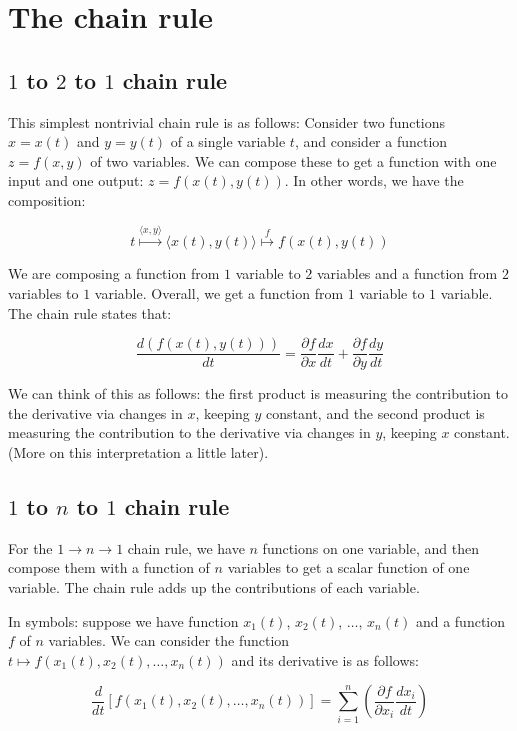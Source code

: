 \documentclass[10pt]{amsart}
\begin{document}
\section{The chain rule}

\subsection{$1$ to $2$ to $1$ chain rule}

This simplest nontrivial chain rule is as follows: Consider two
functions $x = x(t)$ and $y = y(t)$ of a single variable $t$, and
consider a function $z = f(x,y)$ of two variables. We can compose
these to get a function with one input and one output: $z =
f(x(t),y(t))$. In other words, we have the composition:

$$t \stackrel{\langle x, y \rangle}{\mapsto} \langle x(t), y(t) \rangle \stackrel{f}{\mapsto} f(x(t),y(t))$$

We are composing a function from $1$ variable to $2$ variables and a
function from $2$ variables to $1$ variable. Overall, we get a
function from $1$ variable to $1$ variable. The chain rule states that:

$$\frac{d(f(x(t),y(t)))}{dt} = \frac{\partial f}{\partial x} \frac{dx}{dt} + \frac{\partial f}{\partial y}\frac{dy}{dt}$$

We can think of this as follows: the first product is measuring the
contribution to the derivative via changes in $x$, keeping $y$
constant, and the second product is measuring the contribution to the
derivative via changes in $y$, keeping $x$ constant. (More on this
interpretation a little later).

\subsection{$1$ to $n$ to $1$ chain rule}

For the $1 \to n \to 1$ chain rule, we have $n$ functions on one
variable, and then compose them with a function of $n$ variables to
get a scalar function of one variable. The chain rule adds up the
contributions of each variable.

In symbols: suppose we have function $x_1(t)$, $x_2(t)$, $\dots$,
$x_n(t)$ and a function $f$ of $n$ variables. We can consider the
function $t \mapsto f(x_1(t),x_2(t),\dots,x_n(t))$ and its derivative
is as follows:

$$\frac{d}{dt}[f(x_1(t),x_2(t),\dots,x_n(t))] = \sum_{i=1}^n \left(\frac{\partial f}{\partial x_i}\frac{dx_i}{dt}\right)$$
\end{document}
